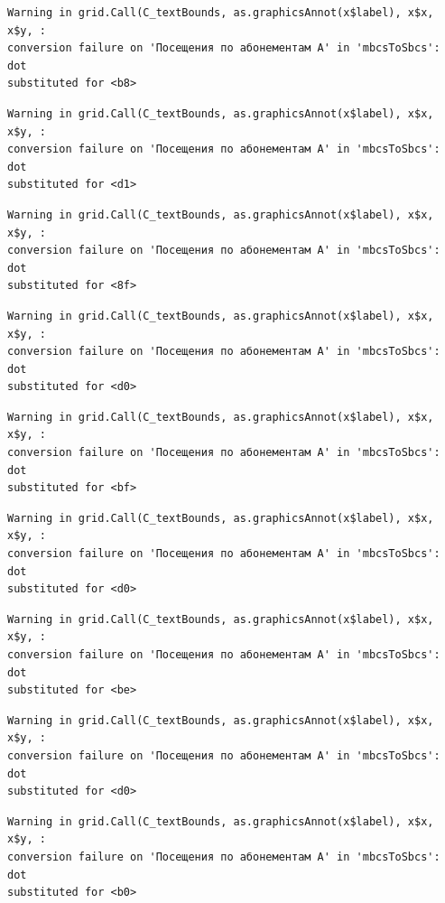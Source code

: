 \documentclass[
  letterpaper,
  DIV=11,
  numbers=noendperiod]{scrartcl}
\begin{document}
\begin{verbatim}
Warning in grid.Call(C_textBounds, as.graphicsAnnot(x$label), x$x, x$y, :
conversion failure on 'Посещения по абонементам А' in 'mbcsToSbcs': dot
substituted for <b8>
\end{verbatim}

\begin{verbatim}
Warning in grid.Call(C_textBounds, as.graphicsAnnot(x$label), x$x, x$y, :
conversion failure on 'Посещения по абонементам А' in 'mbcsToSbcs': dot
substituted for <d1>
\end{verbatim}

\begin{verbatim}
Warning in grid.Call(C_textBounds, as.graphicsAnnot(x$label), x$x, x$y, :
conversion failure on 'Посещения по абонементам А' in 'mbcsToSbcs': dot
substituted for <8f>
\end{verbatim}

\begin{verbatim}
Warning in grid.Call(C_textBounds, as.graphicsAnnot(x$label), x$x, x$y, :
conversion failure on 'Посещения по абонементам А' in 'mbcsToSbcs': dot
substituted for <d0>
\end{verbatim}

\begin{verbatim}
Warning in grid.Call(C_textBounds, as.graphicsAnnot(x$label), x$x, x$y, :
conversion failure on 'Посещения по абонементам А' in 'mbcsToSbcs': dot
substituted for <bf>
\end{verbatim}

\begin{verbatim}
Warning in grid.Call(C_textBounds, as.graphicsAnnot(x$label), x$x, x$y, :
conversion failure on 'Посещения по абонементам А' in 'mbcsToSbcs': dot
substituted for <d0>
\end{verbatim}

\begin{verbatim}
Warning in grid.Call(C_textBounds, as.graphicsAnnot(x$label), x$x, x$y, :
conversion failure on 'Посещения по абонементам А' in 'mbcsToSbcs': dot
substituted for <be>
\end{verbatim}

\begin{verbatim}
Warning in grid.Call(C_textBounds, as.graphicsAnnot(x$label), x$x, x$y, :
conversion failure on 'Посещения по абонементам А' in 'mbcsToSbcs': dot
substituted for <d0>
\end{verbatim}

\begin{verbatim}
Warning in grid.Call(C_textBounds, as.graphicsAnnot(x$label), x$x, x$y, :
conversion failure on 'Посещения по абонементам А' in 'mbcsToSbcs': dot
substituted for <b0>
\end{verbatim}
\end{document}
